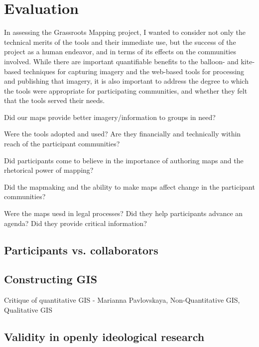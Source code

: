 \documentclass[11pt]{report}
\begin{document}
\chapter{Evaluation}

In assessing the Grassroots Mapping project, I wanted to consider not only the technical merits of the tools and their immediate use, but the success of the project as a human endeavor, and in terms of its effects on the communities involved. While there are important quantifiable benefits to the balloon- and kite-based techniques for capturing imagery and the web-based tools for processing and publishing that imagery, it is also important to address the degree to which the tools were appropriate for participating communities, and whether they felt that the tools served their needs. 

Did our maps provide better imagery/information to groups in need?

Were the tools adopted and used? Are they financially and technically within reach of the participant communities? 

Did participants come to believe in the importance of authoring maps and the rhetorical power of mapping?

Did the mapmaking and the ability to make maps affect change in the participant communities?

Were the maps uesd in legal processes? Did they help participants advance an agenda? Did they provide critical information?

\section{Participants vs. collaborators}


\section{Constructing GIS}

Critique of quantitative GIS - Marianna Pavlovskaya, Non-Quantitative GIS, Qualitative GIS

\section{Validity in openly ideological research}
\end{document}
